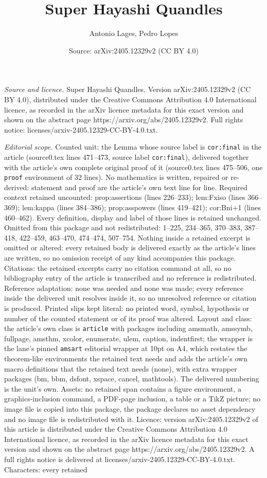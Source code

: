 \documentclass[10pt,a4paper]{amsart}
\title[Super Hayashi Quandles]{Super Hayashi Quandles}
\author{Antonio Lages, Pedro Lopes}
\date{Source: arXiv:2405.12329v2 (CC BY 4.0)}
\begin{document}
\maketitle

\noindent\emph{Source and licence.} Super Hayashi Quandles. Version arXiv:2405.12329v2 (CC BY 4.0), distributed under the Creative Commons Attribution 4.0 International licence, as recorded in the arXiv licence metadata for this exact version and shown on the abstract page https://arxiv.org/abs/2405.12329v2. Full rights notice: licenses/arxiv-2405.12329-CC-BY-4.0.txt.\par\smallskip

\noindent\textit{Editorial scope.} Counted unit: the Lemma whose source label is \texttt{cor:final} in the article (source0.tex lines 471--473, source label \texttt{cor:final}), delivered together with the article's own complete original proof of it (source0.tex lines 475--506, one \texttt{proof} environment of 32 lines). No mathematics is written, repaired or re-derived: statement and proof are the article's own text line for line. Required context retained uncounted: prop:assertions (lines 226--233); lem:Fxiso (lines 366--369); lem:kappa (lines 384--386); prop:asspowers (lines 419--421); cor:Bni+1 (lines 460--462). Every definition, display and label of those lines is retained unchanged. Omitted from this package and not redistributed: 1--225, 234--365, 370--383, 387--418, 422--459, 463--470, 474--474, 507--754. Nothing inside a retained excerpt is omitted or altered: every retained body is delivered exactly as the article's lines are written, so no omission receipt of any kind accompanies this package. Citations: the retained excerpts carry no citation command at all, so no bibliography entry of the article is transcribed and no reference is redistributed. Reference adaptation: none was needed and none was made; every reference inside the delivered unit resolves inside it, so no unresolved reference or citation is produced. Printed slips kept literal: no printed word, symbol, hypothesis or number of the counted statement or of its proof was altered. Layout and class: the article's own class is \texttt{article} with packages including amsmath, amssymb, fullpage, amsthm, xcolor, enumerate, ulem, caption, indentfirst; the wrapper is the lane's pinned \texttt{amsart} editorial wrapper at 10pt on A4, which restates the theorem-like environments the retained text needs and adds the article's own macro definitions that the retained text needs (none), with extra wrapper packages (bm, bbm, dsfont, xspace, cancel, mathtools). The delivered numbering is the unit's own. Assets: no retained span contains a figure environment, a graphics-inclusion command, a PDF-page inclusion, a table or a TikZ picture; no image file is copied into this package, the package declares no asset dependency and no image file is redistributed with it. Licence: version arXiv:2405.12329v2 of this article is distributed under the Creative Commons Attribution 4.0 International licence, as recorded in the arXiv licence metadata for this exact version and shown on the abstract page https://arxiv.org/abs/2405.12329v2. A full rights notice is delivered at licenses/arxiv-2405.12329-CC-BY-4.0.txt. Characters: every retained 
\end{document}
